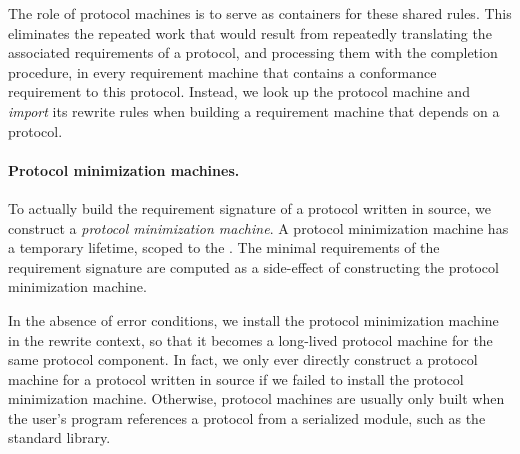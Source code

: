 \documentclass[../generics]{subfiles}
\begin{document}
The role of protocol machines is to serve as containers for these shared rules. This eliminates the repeated work that would result from repeatedly translating the associated requirements of a protocol, and processing them with the completion procedure, in every requirement machine that contains a conformance requirement to this protocol. Instead, we look up the protocol machine and \emph{import} its rewrite rules when building a requirement machine that depends on a protocol.

\paragraph{Protocol minimization machines.}
To actually build the requirement signature of a protocol written in source, we construct a \emph{protocol minimization machine}. A protocol minimization machine has a temporary lifetime, scoped to the . The minimal requirements of the requirement signature are computed as a side-effect of constructing the protocol minimization machine.

In the absence of error conditions, we install the protocol minimization machine in the rewrite context, so that it becomes a long-lived protocol machine for the same protocol component. In fact, we only ever directly construct a protocol machine for a protocol written in source if we failed to install the protocol minimization machine. Otherwise, protocol machines are usually only built when the user's program references a protocol from a serialized module, such as the standard library.
\end{document}

